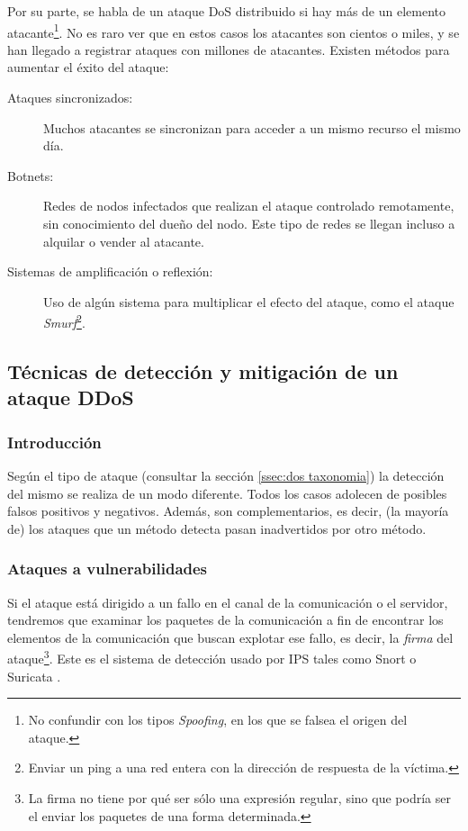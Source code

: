 Por su parte, se habla de un ataque \gls{DoS} distribuido si hay más de un elemento 
atacante\footnote{No confundir con los tipos \emph{Spoofing}, en los que se falsea el origen del ataque.}.
No es raro ver que en estos casos los atacantes son cientos o miles, y se han llegado a registrar ataques 
con millones de atacantes. Existen métodos para aumentar el éxito del ataque:
\begin{description}
  \item[Ataques sincronizados:] Muchos atacantes se sincronizan para acceder a un mismo recurso el
  mismo día.
  \item[Botnets:] Redes de nodos infectados que realizan el ataque controlado remotamente, sin conocimiento del
  dueño del nodo. Este tipo de redes se llegan incluso a alquilar o vender al atacante.
  \item[Sistemas de amplificación o reflexión:] Uso de algún sistema para multiplicar el efecto del ataque,
  como el ataque \emph{Smurf}\footnote{Enviar un ping a una red entera con la dirección de respuesta 
  de la víctima.}.
\end{description}

\subsection{Técnicas de detección y mitigación de un ataque DDoS}\label{sec:dos Deteccion y mitigacion}
\subsubsection{Introducción}
Según el tipo de ataque (consultar la sección \ref{ssec:dos taxonomia}) la detección del mismo se realiza de un modo diferente.
Todos los casos adolecen de posibles falsos positivos y negativos. Además, son complementarios, es decir, (la mayoría de) los
ataques que un método detecta pasan inadvertidos por otro método.

\subsubsection{Ataques a vulnerabilidades}
Si el ataque está dirigido a un fallo en el canal de la comunicación o el servidor,
tendremos que examinar los paquetes de la comunicación a fin de encontrar los elementos de la
comunicación que buscan explotar ese fallo, es decir, la \emph{firma} del ataque\footnote{La firma no tiene
por qué ser sólo una expresión regular, sino que podría ser el enviar los paquetes de una forma determinada.}.
Este es el sistema de detección usado por IPS tales como Snort \cite{snort} o Suricata \cite{suricata}.


